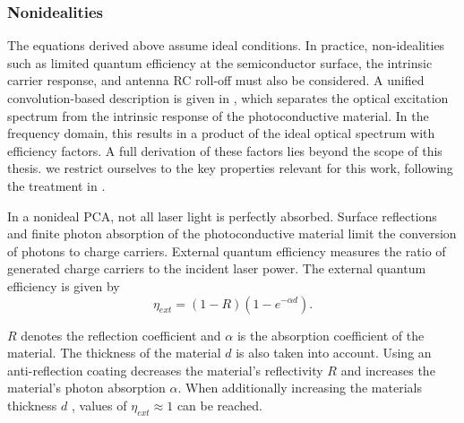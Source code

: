 


\subsubsection{Nonidealities}

The equations derived above assume ideal conditions. In practice, non-idealities such as limited quantum efficiency at the semiconductor surface, the intrinsic carrier response, and antenna RC roll-off must also be considered. A unified convolution-based description is given in \cite{preuUnifiedDerivationTerahertz2014}, which separates the optical excitation spectrum from the intrinsic response of the photoconductive material. In the frequency domain, this results in a product of the ideal optical spectrum with efficiency factors. A full derivation of these factors lies beyond the scope of this thesis. we restrict ourselves to the key properties relevant for this work, following the treatment in \cite{faridiPulsedFreeSpace2023}.

In a nonideal PCA, not all laser light is perfectly absorbed. Surface reflections and finite photon absorption of the photoconductive material limit the conversion of photons to charge carriers. External quantum efficiency measures the ratio of generated charge carriers to the incident laser power. The external quantum efficiency is given by 
\begin{equation}
	\eta_{ext} = (1-R)(1-e^{-\alpha d}). 
	\label{eq_eta_ext}
\end{equation}

$R$ denotes the reflection coefficient and $\alpha$ is the absorption coefficient of the material. The thickness of the material $d$ is also taken into account. Using an anti-reflection coating decreases the material's reflectivity $R$ and increases the material's photon absorption $\alpha$. When additionally increasing the materials thickness $d$ , values of $\eta_{ext} \approx 1$ can be reached.

